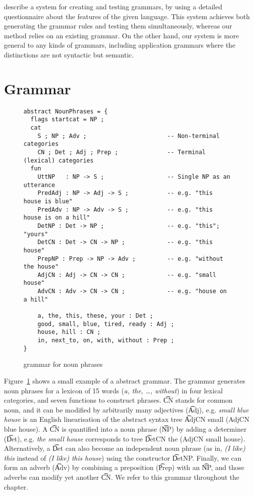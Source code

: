 
\cite{bender2010} describe a system for creating and testing \hpsg{} \cite{pollard1994hpsg}
grammars, by using a detailed questionnaire about the features of the
given language. This system achieves both generating the grammar rules
and testing them simultaneously, whereas our method relies on an
existing grammar. On the other hand, our system is more general to any
kinds of grammars, including application grammars where the
distinctions are not syntactic but semantic.

\section{Grammar}


\begin{figure}[h]
  \centering
\begin{verbatim}
abstract NounPhrases = {
  flags startcat = NP ;
  cat
    S ; NP ; Adv ;                       -- Non-terminal categories
    CN ; Det ; Adj ; Prep ;              -- Terminal (lexical) categories
  fun
    UttNP   : NP -> S ;                  -- Single NP as an utterance
    PredAdj : NP -> Adj -> S ;           -- e.g. "this house is blue"
    PredAdv : NP -> Adv -> S ;           -- e.g. "this house is on a hill"
    DetNP : Det -> NP ;                  -- e.g. "this"; "yours"
    DetCN : Det -> CN -> NP ;            -- e.g. "this house"
    PrepNP : Prep -> NP -> Adv ;         -- e.g. "without the house"
    AdjCN : Adj -> CN -> CN ;            -- e.g. "small house"
    AdvCN : Adv -> CN -> CN ;            -- e.g. "house on a hill"

    a, the, this, these, your : Det ;
    good, small, blue, tired, ready : Adj ;
    house, hill : CN ;
    in, next_to, on, with, without : Prep ; 
}
\end{verbatim}
  \caption{\gf{} grammar for noun phrases}
\label{fig:exampleGrammar}
\end{figure}

Figure~\ref{fig:exampleGrammar} shows a small example of a \gf{} abstract
grammar. The grammar generates noun phrases for a lexicon of 15
words (\emph{a, the, \dots, without}) in four lexical categories,
and seven functions to construct phrases. \t{CN} stands for common
noun, and it can be modified by arbitrarily many adjectives (\t{Adj}),
e.g. \emph{small blue house} is an English linearisation of the
abstract syntax tree \t{AdjCN small (AdjCN blue house)}. A \t{CN} is
quantified into a noun phrase (\t{NP}) by adding a determiner
(\t{Det}), e.g. \emph{the small house} corresponds to tree \t{DetCN the (AdjCN small
  house)}. Alternatively, a \t{Det} can also become an independent
noun phrase (as in, \emph{(I like) this} instead of \emph{(I like) this
  house}) using the constructor \t{DetNP}. Finally, we can form an
adverb (\t{Adv}) by combining a preposition (\t{Prep}) with an \t{NP},
and those adverbs can modify yet another \t{CN}. 
We refer to this grammar throughout the chapter.

